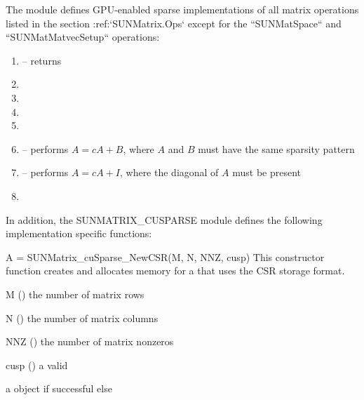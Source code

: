 The  module defines GPU-enabled sparse implementations of all matrix
operations listed in the section :ref:`SUNMatrix.Ops` except for the ``SUNMatSpace``
and ``SUNMatMatvecSetup`` operations:

\begin{enumerate}
  \item {} -- returns 
  \item {}
  \item {}
  \item {}
  \item {}
  \item {} -- performs $A = cA + B$, where $A$ and $B$
    must have the same sparsity pattern
  \item {} -- performs $A = cA + I$, where the diagonal
    of $A$ must be present
  \item {}
\end{enumerate}


In addition, the SUNMATRIX\_CUSPARSE module defines the following implementation specific
functions:

{
  A = SUNMatrix\_cuSparse\_NewCSR(M, N, NNZ, cusp)
}
{
  This constructor function creates and allocates memory for a 
   that uses the CSR storage format.
}
{
  \begin{args}
  \item[M] () the number of matrix rows
  \item[N] () the number of matrix columns
  \item[NNZ] () the number of matrix nonzeros
  \item[cusp] () a valid 
  \end{args}
}
{
  a  object if successful else 
}
{
}

